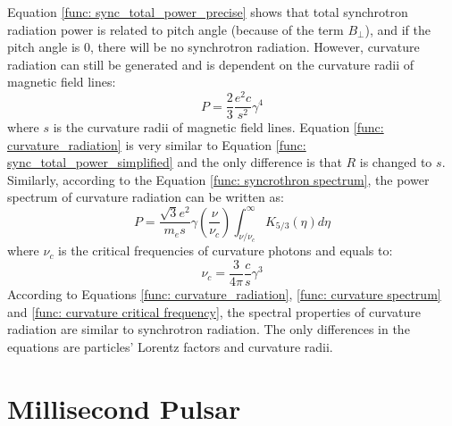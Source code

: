 \documentclass[12pt]{report}
\begin{document}
      Equation \ref{func: sync_total_power_precise} shows that total synchrotron radiation 
      power is related to pitch angle (because of the term $B_\perp$), and if the 
      pitch angle is $0$, there will be no synchrotron radiation. However, curvature 
      radiation can still be generated and is dependent on the curvature radii of 
      magnetic field lines:
      \begin{equation}
        \label{func: curvature_radiation}
        P = \frac{2}{3}\frac{e^2c}{s^2}\gamma^4
      \end{equation}
      where $s$ is the curvature radii of magnetic field lines. 
      Equation \ref{func: curvature_radiation} is very similar to Equation 
      \ref{func: sync_total_power_simplified} and the only difference is that 
      $R$ is changed to $s$. Similarly, according to the Equation 
      \ref{func: syncrothron spectrum}, the power spectrum of curvature radiation can 
      be written as:
      \begin{equation}
        \label{func: curvature spectrum}
        P = \frac{\sqrt{3}e^2}{m_es}\gamma \left(\frac{\nu}{\nu_c}\right) \int_{\nu / \nu_c}^{\infty} K_{5/3}\left(\eta \right)d\eta
      \end{equation}
      where $\nu_c$ is the critical frequencies of curvature photons and equals to:
      \begin{equation}
        \label{func: curvature critical frequency}
        \nu_c = \frac{3}{4\pi}\frac{c}{s}\gamma^3
      \end{equation}
      According to Equations \ref{func: curvature_radiation}, \ref{func: curvature spectrum} 
      and \ref{func: curvature critical frequency}, the spectral properties of curvature 
      radiation are similar to synchrotron radiation. The only differences in the 
      equations are particles' Lorentz factors and curvature radii. 


  \section{Millisecond Pulsar} 
\end{document}
